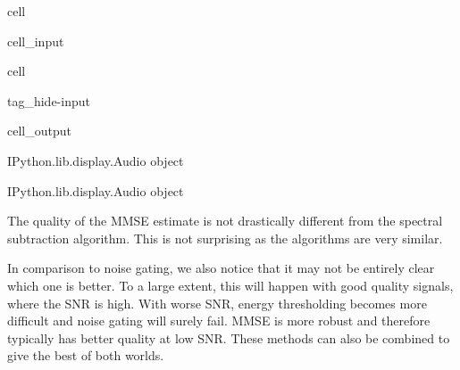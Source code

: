 \documentclass[letterpaper,10pt,english]{jupyterBook}
\begin{document}
\begin{sphinxuseclass}{cell}\begin{sphinxVerbatimInput}

\begin{sphinxuseclass}{cell_input}
\begin{sphinxVerbatim}[commandchars=\\\{\}]
  
  
\end{sphinxVerbatim}

\end{sphinxuseclass}\end{sphinxVerbatimInput}

\end{sphinxuseclass}
\begin{sphinxuseclass}{cell}
\begin{sphinxuseclass}{tag_hide-input}\begin{sphinxVerbatimOutput}

\begin{sphinxuseclass}{cell_output}
\begin{sphinxVerbatim}[commandchars=\\\{\}]
\PYGZlt{}IPython.lib.display.Audio object\PYGZgt{}
\end{sphinxVerbatim}

\noindent{}

\begin{sphinxVerbatim}[commandchars=\\\{\}]
\PYGZlt{}IPython.lib.display.Audio object\PYGZgt{}
\end{sphinxVerbatim}

\end{sphinxuseclass}\end{sphinxVerbatimOutput}

\end{sphinxuseclass}
\end{sphinxuseclass}
\sphinxAtStartPar
The quality of the MMSE estimate is not drastically different from the spectral subtraction algorithm. This is not surprising as the algorithms are very similar.

\sphinxAtStartPar
In comparison to noise gating, we also notice that it may not be entirely clear which one is better. To a large extent, this will happen with good quality signals, where the SNR is high. With worse SNR, energy thresholding becomes more difficult and noise gating will surely fail. MMSE is more robust and therefore typically has better quality at low SNR. These methods can also be combined to give the best of both worlds.
\end{document}
